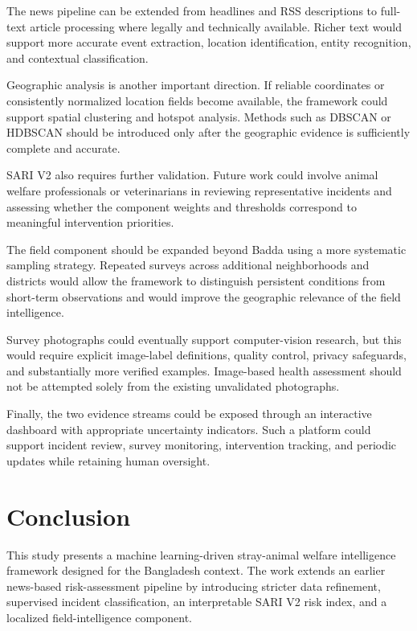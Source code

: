 \documentclass[conference]{IEEEtran}
\begin{document}
The news pipeline can be extended from headlines and RSS descriptions to
full-text article processing where legally and technically available. Richer
text would support more accurate event extraction, location identification,
entity recognition, and contextual classification.

Geographic analysis is another important direction. If reliable coordinates
or consistently normalized location fields become available, the framework
could support spatial clustering and hotspot analysis. Methods such as DBSCAN
or HDBSCAN should be introduced only after the geographic evidence is
sufficiently complete and accurate.

SARI V2 also requires further validation. Future work could involve animal
welfare professionals or veterinarians in reviewing representative incidents
and assessing whether the component weights and thresholds correspond to
meaningful intervention priorities.

The field component should be expanded beyond Badda using a more systematic
sampling strategy. Repeated surveys across additional neighborhoods and
districts would allow the framework to distinguish persistent conditions from
short-term observations and would improve the geographic relevance of the
field intelligence.

Survey photographs could eventually support computer-vision research, but
this would require explicit image-label definitions, quality control,
privacy safeguards, and substantially more verified examples. Image-based
health assessment should not be attempted solely from the existing
unvalidated photographs.

Finally, the two evidence streams could be exposed through an interactive
dashboard with appropriate uncertainty indicators. Such a platform could
support incident review, survey monitoring, intervention tracking, and
periodic updates while retaining human oversight.


\section{Conclusion}

This study presents a machine learning-driven stray-animal welfare
intelligence framework designed for the Bangladesh context. The work extends
an earlier news-based risk-assessment pipeline by introducing stricter data
refinement, supervised incident classification, an interpretable SARI V2
risk index, and a localized field-intelligence component.
\end{document}

